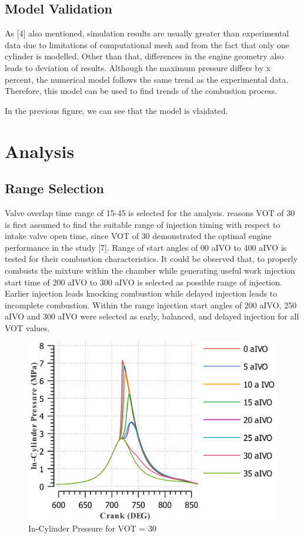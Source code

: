 \documentclass[conference]{IEEEtran}
\begin{document}
\subsection{Model Validation}
As [4] also mentioned, simulation results are usually greater than experimental data due to limitations of computational mesh and from the fact that only one cylinder is modelled. Other than that, differences in the engine geometry also leads to deviation of results.
Although the maximum pressure differs by x percent, the numerical model follows the same trend as the experimental data. Therefore, this model can be used to find trends of the combustion process.

In the previous figure, we can see that the model is vlaidated.
    
\section{Analysis}
\subsection{Range Selection}
Valve overlap time range of 15-45 is selected for the analysis. reasons
VOT of 30 is first assumed to find the suitable range of injection timing with respect to intake valve open time, since VOT of 30 demonstrated the optimal engine performance in the study [7].
Range of start angles of 00 aIVO to 400 aIVO is tested for their combustion characteristics. 
It could be observed that, to properly combusts the mixture within the chamber while generating useful work injection start time of 200 aIVO to 300 aIVO is selected as possible range of injection.
Earlier injection leads knocking combustion while delayed injection leads to incomplete combustion.
Within the range injection start angles of 200 aIVO, 250 aIVO and 300 aIVO were selected as early, balanced, and delayed injection for all VOT values.

\begin{figure}[htbp]
    \centerline{\includegraphics{Plots/30_pressure.png}}
    \caption{In-Cylinder Pressure for VOT = 30}
    \label{plt_tttt}
    \end{figure}
\end{document}
